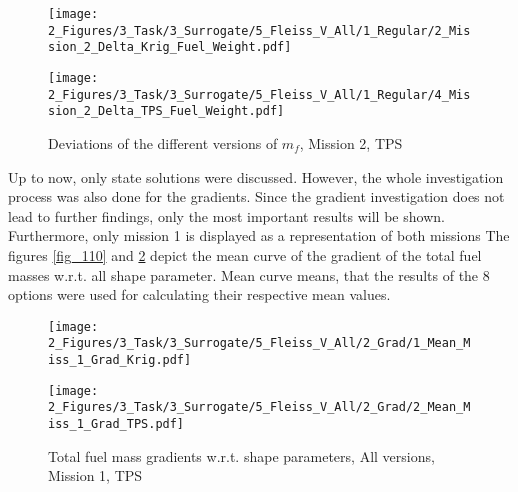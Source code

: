 \begin{figure}[!h]
    \begin{minipage}[h]{0.46\textwidth}
        \centering
        \texttt{[image: 2\_Figures/3\_Task/3\_Surrogate/5\_Fleiss\_V\_All/1\_Regular/2\_Mission\_2\_Delta\_Krig\_Fuel\_Weight.pdf]}
        \caption{Deviations of the different versions of $m_{f}$, Mission 2, Kriging}
        \label{fig_108}    
    \end{minipage}
    \hfill
    \begin{minipage}{0.46\textwidth}
        \centering
        \texttt{[image: 2\_Figures/3\_Task/3\_Surrogate/5\_Fleiss\_V\_All/1\_Regular/4\_Mission\_2\_Delta\_TPS\_Fuel\_Weight.pdf]}
        \caption{Deviations of the different versions of $m_{f}$, Mission 2, TPS}
        \label{fig_109}    
    \end{minipage}
\end{figure} 

\FloatBarrier
Up to now, only state solutions were discussed. However, the whole 
investigation process was also done for the gradients.
Since the gradient investigation does not lead to
further findings, only 
the most important results will be shown. Furthermore,
only mission 1 is displayed as a representation of both missions
The figures \ref{fig_110} and \ref{fig_111} 
depict the mean curve of the gradient 
of the total fuel masses w.r.t. all shape parameter.
Mean curve means, that the results of the 8 options 
were used for calculating their respective mean values.\newline

\begin{figure}[!h]
    \begin{minipage}[h]{0.46\textwidth}
        \centering
        \texttt{[image: 2\_Figures/3\_Task/3\_Surrogate/5\_Fleiss\_V\_All/2\_Grad/1\_Mean\_Miss\_1\_Grad\_Krig.pdf]}
        \caption{Total fuel mass gradients w.r.t. shape parameters, All versions, Mission 1, Kriging}
        \label{fig_110}    
    \end{minipage}
    \hfill
    \begin{minipage}{0.46\textwidth}
        \centering
        \texttt{[image: 2\_Figures/3\_Task/3\_Surrogate/5\_Fleiss\_V\_All/2\_Grad/2\_Mean\_Miss\_1\_Grad\_TPS.pdf]}
        \caption{Total fuel mass gradients w.r.t. shape parameters, All versions, Mission 1, TPS}
        \label{fig_111}    
    \end{minipage}
\end{figure} 

